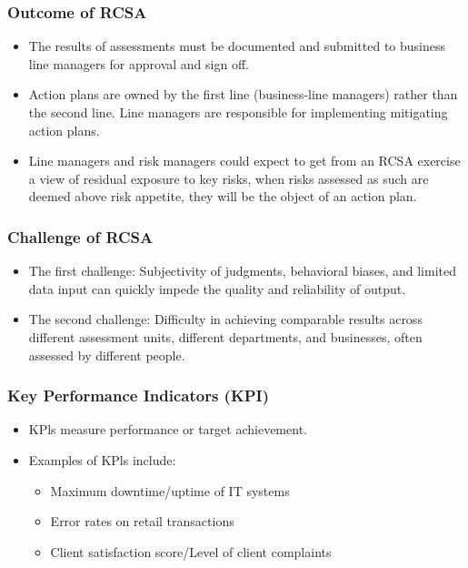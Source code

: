 \subsubsection{Outcome of RCSA }
\begin{itemize}
\item The results of assessments must be documented and submitted to business line managers for approval and sign off.
\item  Action plans are owned by the first line (business-line managers) rather than the second line. Line managers are responsible for implementing mitigating action plans.
\item  Line managers and risk managers could expect to get from an RCSA exercise a view of residual exposure to key risks, when risks assessed as such are deemed above risk appetite, they will be the object of an action plan.
\end{itemize}


\subsubsection{Challenge of RCSA }
\begin{itemize}
\item The first challenge: Subjectivity of judgments, behavioral biases, and limited data input can quickly impede the quality and reliability of output.
\item  The second challenge: Difficulty in achieving comparable results across different assessment units, different departments, and businesses, often assessed by different people.
\end{itemize}


\subsubsection{Key Performance Indicators (KPI) }
\begin{itemize}
\item KPls measure performance or target achievement.
\item Examples of KPls include:
    \begin{itemize}
    \item Maximum downtime/uptime of IT systems
    \item  Error rates on retail transactions
    \item  Client satisfaction score/Level of client complaints
    
    \end{itemize}
\end{itemize}


